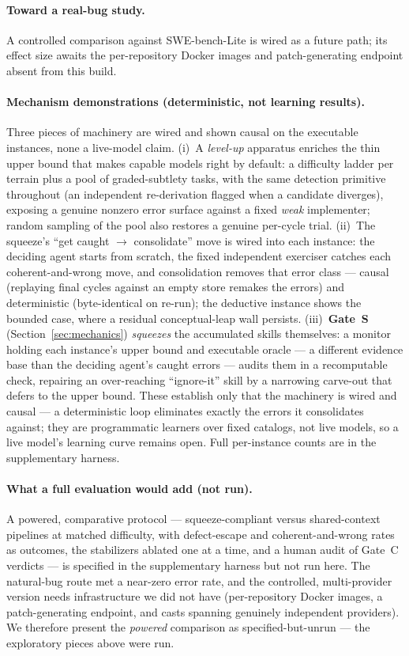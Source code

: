 \documentclass[11pt]{article}
\begin{document}
\paragraph{Toward a real-bug study.} A controlled comparison against SWE-bench-Lite
\citep{jimenez2023swebench} is wired as a future path; its effect size awaits the per-repository Docker
images and patch-generating endpoint absent from this build.

\paragraph{Mechanism demonstrations (deterministic, not learning results).} Three pieces of
machinery are wired and shown causal on the executable instances, none a live-model claim. (i)~A
\emph{level-up} apparatus enriches the thin upper bound that makes capable models right by
default: a difficulty ladder per terrain plus a pool of graded-subtlety tasks, with the same
detection primitive throughout (an independent re-derivation flagged when a candidate diverges),
exposing a genuine nonzero error surface against a fixed \emph{weak} implementer; random
sampling of the pool also restores a genuine per-cycle trial. (ii)~The squeeze's ``get caught
$\to$ consolidate'' move is wired into each instance: the deciding agent starts from scratch, the
fixed independent exerciser catches each coherent-and-wrong move, and consolidation removes that
error class --- causal (replaying final cycles against an empty store remakes the errors) and
deterministic (byte-identical on re-run); the deductive instance shows the bounded case, where a
residual conceptual-leap wall persists. (iii)~\textbf{Gate~S} (Section~\ref{sec:mechanics})
\emph{squeezes} the accumulated skills themselves: a monitor holding each instance's upper bound
and executable oracle --- a different evidence base than the deciding agent's caught errors ---
audits them in a recomputable check, repairing an over-reaching ``ignore-it'' skill by a
narrowing carve-out that defers to the upper bound. These establish only that the machinery is
wired and causal --- a deterministic loop eliminates exactly the errors it consolidates against;
they are programmatic learners over fixed catalogs, not live models, so a live model's learning
curve remains open. Full per-instance counts are in the supplementary harness.

\paragraph{What a full evaluation would add (not run).} A powered, comparative protocol
--- squeeze-compliant versus shared-context pipelines at matched difficulty, with defect-escape
and coherent-and-wrong rates as outcomes, the stabilizers ablated one at a time, and a human
audit of Gate~C verdicts --- is specified in the supplementary harness but not run here. The
natural-bug route met a near-zero error rate, and the controlled, multi-provider version needs
infrastructure we did not have (per-repository Docker images, a patch-generating endpoint, and
casts spanning genuinely independent providers). We therefore present the \emph{powered} comparison
as specified-but-unrun --- the exploratory pieces above were run.
\end{document}
